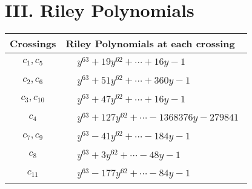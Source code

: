 \documentclass[1p]{elsarticle_modified}
\theoremstyle{definition}
\begin{document}
\centering \section*{ III. Riley Polynomials}
\begin{tabular}{m{50pt}|m{274pt}}
Crossings & \hspace{64pt}Riley Polynomials at each crossing \\
\hline $$\begin{aligned}c_{1},c_{5}\end{aligned}$$&$\begin{aligned}
&y^{63}+19 y^{62}+\cdots+16 y-1
\end{aligned}$\\
\hline $$\begin{aligned}c_{2},c_{6}\end{aligned}$$&$\begin{aligned}
&y^{63}+51 y^{62}+\cdots+360 y-1
\end{aligned}$\\
\hline $$\begin{aligned}c_{3},c_{10}\end{aligned}$$&$\begin{aligned}
&y^{63}+47 y^{62}+\cdots+16 y-1
\end{aligned}$\\
\hline $$\begin{aligned}c_{4}\end{aligned}$$&$\begin{aligned}
&y^{63}+127 y^{62}+\cdots-1368376 y-279841
\end{aligned}$\\
\hline $$\begin{aligned}c_{7},c_{9}\end{aligned}$$&$\begin{aligned}
&y^{63}-41 y^{62}+\cdots-184 y-1
\end{aligned}$\\
\hline $$\begin{aligned}c_{8}\end{aligned}$$&$\begin{aligned}
&y^{63}+3 y^{62}+\cdots-48 y-1
\end{aligned}$\\
\hline $$\begin{aligned}c_{11}\end{aligned}$$&$\begin{aligned}
&y^{63}-177 y^{62}+\cdots-84 y-1
\end{aligned}$\\
\hline
\end{tabular}
\vskip 2pc
\end{document}
